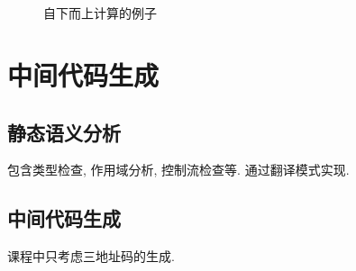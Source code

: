 \documentclass{ctexart}
\begin{document}
    \begin{figure}%
        \centering
        \\
        \\
        \caption{自下而上计算的例子}%
        \label{gen-deduction-code}
    \end{figure}

\section{中间代码生成}
\subsection{静态语义分析}
    包含类型检查, 作用域分析, 控制流检查等. 通过翻译模式实现.
\subsection{中间代码生成}
    课程中只考虑三地址码的生成.
\end{document}
